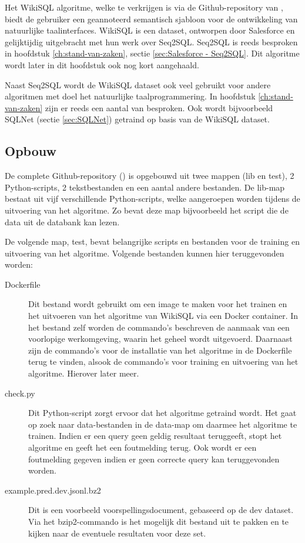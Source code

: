 Het WikiSQL algoritme, welke te verkrijgen is via de Github-repository van \textcite{wikisql}, biedt de gebruiker een geannoteerd semantisch sjabloon voor de ontwikkeling van natuurlijke taalinterfaces. WikiSQL is een dataset, ontworpen door Salesforce en gelijktijdig uitgebracht met hun werk over Seq2SQL. Seq2SQL is reeds besproken in hoofdstuk \ref{ch:stand-van-zaken}, sectie \ref{sec:Salesforce - Seq2SQL}. Dit algoritme wordt later in dit hoofdstuk ook nog kort aangehaald.

Naast Seq2SQL wordt de WikiSQL dataset ook veel gebruikt voor andere algoritmen met doel het natuurlijke taalprogrammering. In hoofdstuk \ref{ch:stand-van-zaken} zijn er reeds een aantal van besproken. Ook wordt bijvoorbeeld SQLNet (sectie \ref{sec:SQLNet}) getraind op basis van de WikiSQL dataset.

\subsection{Opbouw}

De complete Github-repository (\textcite{wikisql}) is opgebouwd uit twee mappen (lib en test), 2 Python-scripts, 2 tekstbestanden en een aantal andere bestanden. De lib-map bestaat uit vijf verschillende Python-scripts, welke aangeroepen worden tijdens de uitvoering van het algoritme. Zo bevat deze map bijvoorbeeld het script die de data uit de databank kan lezen. 

De volgende map, test, bevat belangrijke scripts en bestanden voor de training en uitvoering van het algoritme. Volgende bestanden kunnen hier teruggevonden worden:
\begin{description}
	\item[Dockerfile] Dit bestand wordt gebruikt om een image te maken voor het trainen en het uitvoeren van het algoritme van WikiSQL via een Docker container. In het bestand zelf worden de commando's beschreven de aanmaak van een voorlopige werkomgeving, waarin het geheel wordt uitgevoerd. Daarnaast zijn de commando's voor de installatie van het algoritme in de Dockerfile terug te vinden, alsook de commando's voor training en uitvoering van het algoritme. Hierover later meer.
	\item[check.py] Dit Python-script zorgt ervoor dat het algoritme getraind wordt. Het gaat op zoek naar data-bestanden in de data-map om daarmee het algoritme te trainen. Indien er een query geen geldig resultaat teruggeeft, stopt het algoritme en geeft het een foutmelding terug. Ook wordt er een foutmelding gegeven indien er geen correcte query kan teruggevonden worden.
	\item[example.pred.dev.jsonl.bz2] Dit is een voorbeeld voorspellingsdocument, gebaseerd op de dev dataset. Via het bzip2-commando is het mogelijk dit bestand uit te pakken en te kijken naar de eventuele resultaten voor deze set.
\end{description}

